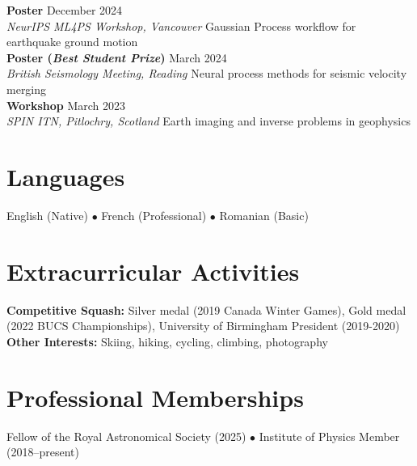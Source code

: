 \documentclass[11pt,a4paper]{article}
\newcommand{\cventry}[4]{%
    \noindent\textbf{#1} \hfill #2\\
    \textit{#3} \hfill #4\\[0.3em]
}
\begin{document}
\cventry{Poster}{December 2024}{NeurIPS ML4PS Workshop, Vancouver}{Gaussian Process workflow for earthquake ground motion}

\cventry{Poster (\textit{Best Student Prize})}{March 2024}{British Seismology Meeting, Reading}{Neural process methods for seismic velocity merging}

\cventry{Workshop}{March 2023}{SPIN ITN, Pitlochry, Scotland}{Earth imaging and inverse problems in geophysics}

\section*{Languages}
English (Native) $\bullet$ French (Professional) $\bullet$ Romanian (Basic)

\section*{Extracurricular Activities}
\textbf{Competitive Squash:} Silver medal (2019 Canada Winter Games), Gold medal (2022 BUCS Championships), University of Birmingham President (2019-2020) \\
\textbf{Other Interests:} Skiing, hiking, cycling, climbing, photography

\section*{Professional Memberships}
Fellow of the Royal Astronomical Society (2025) $\bullet$ Institute of Physics Member (2018--present)
\end{document}
